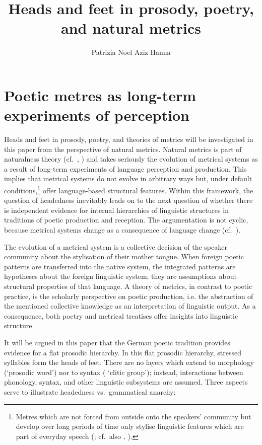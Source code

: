 \documentclass[output=paper
  ,nobabel
  ,uniformtopskip %
]{langscibook}
\title{Heads and feet in prosody, poetry, and natural metrics}
\author{Patrizia Noel Aziz Hanna\orcid{0000-0001-7016-8587}\affiliation{Otto-Friedrich-Universität Bamberg}}
\begin{document}
\maketitle
\section{Poetic metres as long-term experiments of perception}\label{sec-long-term}

Heads and feet in prosody, poetry, and theories of metrics will be investigated in this paper from the perspective of natural metrics. Natural metrics is part of naturalness theory (cf.\ \citealt{Donegan1979}, \citealt{HurchNathan1996}) and takes seriously the evolution of metrical systems as a result of long-term experiments of language perception and production. This implies that metrical systems do not evolve in arbitrary ways but, under default conditions,\footnote{{Metres which are not forced from outside onto the speakers' community but develop over long periods of time only stylise linguistic features which are part of everyday speech (\citealt{Vennemann1995}; cf.\ also \citealt{Miller1902}, \citealt{Allen1973}).} } offer language-based structural features. Within this framework, the question of headedness inevitably leads on to the next question of whether there is independent evidence for internal hierarchies of linguistic structures in traditions of poetic production and reception. The argumentation is not cyclic, because metrical systems change as a consequence of language change (cf.\ \eg  \cite{NoelAzizHanna2008a}).

The evolution of a metrical system is a collective decision of the speaker community about the stylisation of their mother tongue. When foreign poetic patterns are transferred into the native system, the integrated patterns are hypotheses about the foreign linguistic system; they are assumptions about structural properties of that language. A theory of metrics, in contrast to poetic practice, is the scholarly perspective on poetic production, i.e. the abstraction of the mentioned collective knowledge as an interpretation of linguistic output. As a consequence, both poetry and metrical treatises offer insights into linguistic structure.

It will be argued in this paper that the German poetic tradition provides evidence for a flat
prosodic hierarchy. In this flat prosodic hierarchy, stressed syllables form the heads of
feet. There are no layers which extend to morphology (\eg `prosodic word') nor to syntax (\eg
`clitic group'); instead, interactions between phonology, syntax, and other linguistic subsystems
are assumed. Three aspects serve to illustrate headedness vs.\ grammatical anarchy:
\end{document}
